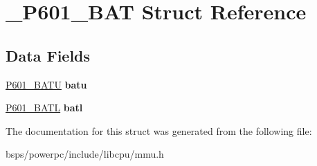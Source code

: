 \hypertarget{struct__P601__BAT}{}\section{\+\_\+\+P601\+\_\+\+B\+AT Struct Reference}
\label{struct__P601__BAT}
\subsection*{Data Fields}
\begin{DoxyCompactItemize}
\item 
\mbox{\label{struct__P601__BAT_a726250cae267e58c63237528090189cf}} 
\mbox{\hyperlink{struct__P601__BATU}{P601\+\_\+\+B\+A\+TU}} {\bfseries batu}
\item 
\mbox{\label{struct__P601__BAT_ad3ee49d81b0e5fdbc46db25208c23e95}} 
\mbox{\hyperlink{struct__P601__BATL}{P601\+\_\+\+B\+A\+TL}} {\bfseries batl}
\end{DoxyCompactItemize}


The documentation for this struct was generated from the following file\+:\begin{DoxyCompactItemize}
\item 
bsps/powerpc/include/libcpu/mmu.\+h\end{DoxyCompactItemize}
